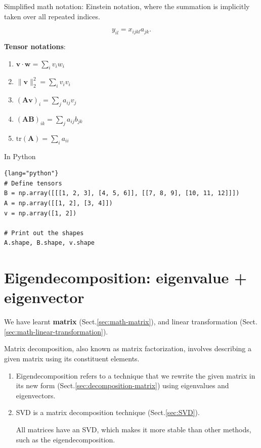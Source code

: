 \begin{mdframed}
Simplified math notation: Einstein notation,
where the summation is implicitly taken over all repeated indices.

\begin{equation}
y_{il} = x_{ijkl}a_{jk}.
\end{equation}
\end{mdframed}

{\bf Tensor notations}:
\begin{enumerate}
  \item  $\mathbf{v} \cdot \mathbf{w} = \sum_i v_iw_i$
\item  $\|\mathbf{v}\|_2^{2} = \sum_i v_iv_i$
\item  $(\mathbf{A}\mathbf{v})_i = \sum_j a_{ij}v_j$
\item  $(\mathbf{A}\mathbf{B})_{ik} = \sum_j a_{ij}b_{jk}$
\item  $\mathrm{tr}(\mathbf{A}) = \sum_i a_{ii}$
\end{enumerate}

In Python
\begin{lstlisting}{lang="python"}
# Define tensors
B = np.array([[[1, 2, 3], [4, 5, 6]], [[7, 8, 9], [10, 11, 12]]])
A = np.array([[1, 2], [3, 4]])
v = np.array([1, 2])

# Print out the shapes
A.shape, B.shape, v.shape
\end{lstlisting}




\chapter{Eigendecomposition: eigenvalue + eigenvector}
\label{sec:eigendecomposition}

We have learnt {\bf matrix } (Sect.\ref{sec:math-matrix}), and linear transformation (Sect.\ref{sec:math-linear-transformation}).

Matrix decomposition, also known as matrix factorization, involves describing a given matrix using its constituent elements.
\begin{enumerate}

  \item Eigendecomposition refers to a technique that we rewrite the given matrix in its
new form (Sect.\ref{sec:decomposition-matrix}) using eigenvalues and
eigenvectors.
  
  \item  SVD is a matrix decomposition technique (Sect.\ref{sec:SVD}).

All matrices have an SVD, which makes it more stable than other methods, such as
the eigendecomposition.

\end{enumerate}



